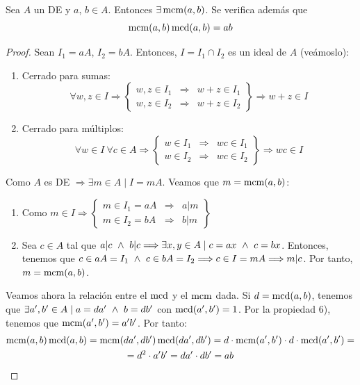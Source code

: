 \begin{teo}
    \label{teo:Existenciamcm}
    Sea $A$ un DE y $a$, $b \in A$. Entonces $\exists \operatorname{mcm}(a,b)$. Se verifica además que 
    $$\operatorname{mcm}(a,b)\operatorname{mcd}(a,b) = ab$$
\end{teo}
\begin{proof}
    Sean $I_1 = aA$, $I_2=bA$. Entonces, $I=I_1 \cap I_2$ es un ideal de $A$ (veámoslo):
    \begin{enumerate}
        \item Cerrado para sumas:
        $$\forall w,z \in I \Longrightarrow \left\{ \begin{array}{lll}
            w,z \in I_1 & \Longrightarrow & w+z \in I_1 \\
            w,z \in I_2 & \Longrightarrow & w+z \in I_2
        \end{array} \right\} \Longrightarrow w+z \in I$$

        \item Cerrado para múltiplos:
        $$\forall w \in I ~\forall c \in A \Longrightarrow \left\{ \begin{array}{lll}
            w \in I_1 & \Longrightarrow & wc \in I_1 \\
            w \in I_2 & \Longrightarrow & wc \in I_2
        \end{array} \right\} \Longrightarrow wc \in I$$
    \end{enumerate}    
    
    Como $A$ es DE $\Longrightarrow \exists m \in A \mid I = mA$. Veamos que $m=\operatorname{mcm}(a,b)$:
    \begin{enumerate}
        \item Como $\displaystyle m \in I \Longrightarrow \left\{ \begin{array}{lll}
            m \in I_1 = aA & \Longrightarrow & a|m \\
            m \in I_2 = bA & \Longrightarrow & b|m
        \end{array} \right\}$

        \item Sea $c \in A$ tal que $a|c \ \land \  b|c \Longrightarrow \exists x,y \in A \mid c=ax \ \land \  c=bx$. Entonces, tenemos que $c \in aA=I_1 \ \land \  c\in bA=I_2 \Longrightarrow c \in I =mA \Longrightarrow m|c$. Por tanto, $m = \operatorname{mcm}(a,b)$.
    \end{enumerate}

    Veamos ahora la relación entre el $\operatorname{mcd}$ y el $\operatorname{mcm}$ dada. Si $d=\operatorname{mcd}(a,b)$, tenemos que $\exists a', b' \in A \mid a=da' \ \land \  b=db'$ con $\operatorname{mcd}(a',b')=1$. Por la propiedad 6), tenemos que $\operatorname{mcm}(a',b')=a'b'$. Por tanto:
    \begin{multline*}
        \operatorname{mcm}(a,b)\operatorname{mcd}(a,b) = \operatorname{mcm}(da',db')\operatorname{mcd}(da',db') = d\cdot \operatorname{mcm}(a',b') \cdot d \cdot \operatorname{mcd}(a',b') = \\
        =d^2 \cdot a'b' = da' \cdot db' = ab
    \end{multline*}
\end{proof}

